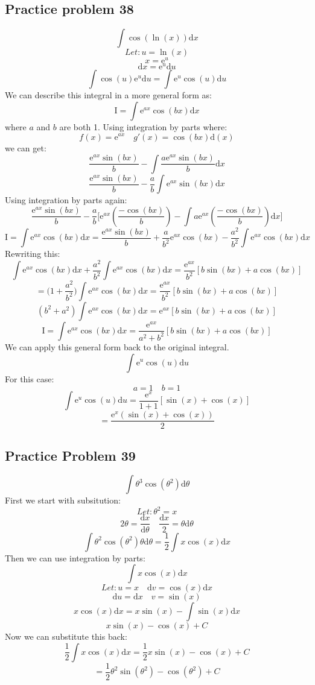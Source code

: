 \documentclass[letterpaper, 12pt]{article}
\newcommand*{\diff}{\mathrm{d}}
\newcommand*{\e}{\mathrm{e}}
\begin{document}
\subsection*{Practice problem 38}
\[ \int{\cos(\ln(x))\diff{x}} \]
\[ Let: u = \ln(x) \]
\[ x = \e^{u} \]
\[ \diff{x} = \e^{u}\diff{u} \]
\[ \int{\cos(u)\e^{u}\diff{u}} = \int{\e^{u}\cos(u)\diff{u}} \]
We can describe this integral in a more general form as:
\[ \mathrm{I} = \int{\e^{ax}\cos(bx)\diff{x}} \]
where \( a \) and \( b \) are both 1. Using integration by parts where:
\[ f(x) = \e^{ax} \quad g'(x) = \cos(bx)\diff(x) \]
we can get:
\[ \frac{\e^{ax}\sin(bx)}{b}-\int{\frac{a\e^{ax}\sin(bx)}{b}\diff{x}} \]
\[ \frac{\e^{ax}\sin(bx)}{b}-\frac{a}{b}\int{\e^{ax}\sin(bx)\diff{x}} \]
Using integration by parts again:
\[ \frac{\e^{ax}\sin(bx)}{b}-\frac{a}{b}\bigg[\e^{ax}(\frac{-\cos(bx)}{b})-
   \int{a\e^{ax}(\frac{-\cos(bx)}{b})\diff{x}}\bigg] \]
\[ \mathrm{I} = \int{\e^{ax}\cos(bx)\diff{x}} =
   \frac{\e^{ax}\sin(bx)}{b}+\frac{a}{b^{2}}\e^{ax}\cos(bx)-\frac{a^{2}}{b^{2}}
   \int{\e^{ax}\cos(bx)\diff{x}} \]
Rewriting this:
\[ \int{\e^{ax}\cos(bx)\diff{x}}+
   \frac{a^{2}}{b^{2}}\int{\e^{ax}\cos(bx)\diff{x}} =
   \frac{\e^{ax}}{b^{2}}[b\sin(bx)+a\cos(bx)] \]
\[ = \bigg(1+\frac{a^{2}}{b^{2}}\bigg)\int{\e^{ax}\cos(bx)\diff{x}} =
   \frac{\e^{ax}}{b^{2}}[b\sin(bx)+a\cos(bx)] \]
\[ (b^{2}+a^{2})\int{\e^{ax}\cos(bx)\diff{x}} = \e^{ax}[b\sin(bx)+a\cos(bx)] \]
\[ \mathrm{I} = \int{\e^{ax}\cos(bx)\diff{x}} =
   \frac{\e^{ax}}{a^{2}+b^{2}}[b\sin(bx)+a\cos(bx)] \]
We can apply this general form back to the original integral.
\[ \int{\e^{u}\cos(u)\diff{u}} \]
For this case:
\[ a = 1 \quad b = 1 \]
\[ \int{\e^{u}\cos(u)\diff{u}} = \frac{\e^{x}}{1+1}[\sin(x)+\cos(x)] \]
\[ = \frac{\e^{x}(\sin(x)+\cos(x))}{2} \]

\subsection*{Practice Problem 39}
\[ \int{\theta^{3}\cos(\theta^{2})\diff{\theta}} \]
First we start with subsitution:
\[ Let: \theta^{2} = x \]
\[ 2\theta = \frac{\diff{x}}{\diff{\theta}} \quad
   \frac{\diff{x}}{2} = \theta\diff{\theta} \]
\[ \int{\theta^{2}\cos(\theta^{2})\theta\diff{\theta}} =
   \frac{1}{2}\int{x\cos(x)\diff{x}} \]
Then we can use integration by parts:
\[ \int{x\cos(x)\diff{x}} \]
\[ Let: u = x \quad \diff{v} = \cos(x)\diff{x} \]
\[ \diff{u} = \diff{x} \quad v = \sin(x) \]
\[ x\cos(x)\diff{x} = x\sin(x)-\int{\sin(x)\diff{x}} \]
\[ x\sin(x)-\cos(x)+C \]
Now we can substitute this back:
\[ \frac{1}{2}\int{x\cos(x)\diff{x}} = \frac{1}{2}x\sin(x)-\cos(x)+C \]
\[ = \frac{1}{2}\theta^{2}\sin(\theta^{2})-\cos(\theta^{2})+C \]
\end{document}

